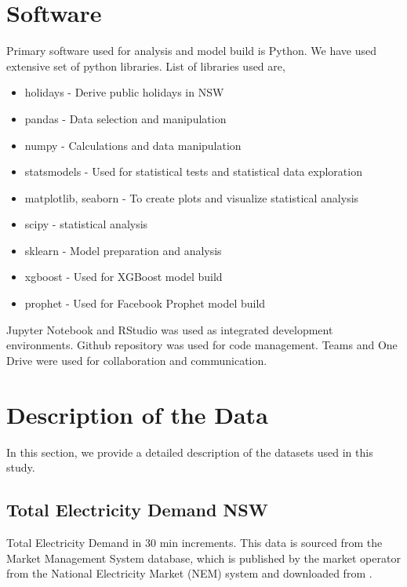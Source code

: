 \documentclass[mstat,12pt]{unswthesis}
\begin{document}
\section{Software}\label{software}

Primary software used for analysis and model build is Python. We have
used extensive set of python libraries. List of libraries used are,

\begin{itemize}
  \item holidays - Derive public holidays in NSW 
  \item pandas - Data selection and manipulation
  \item numpy - Calculations and data manipulation
  \item statsmodels - Used for statistical tests and statistical data exploration
  \item matplotlib, seaborn - To create plots and visualize statistical analysis
  \item scipy - statistical analysis
  \item sklearn - Model preparation and analysis
  \item xgboost - Used for XGBoost model build
  \item prophet - Used for Facebook Prophet model build
\end{itemize}

Jupyter Notebook and RStudio was used as integrated development
environments. Github repository was used for code management. Teams and
One Drive were used for collaboration and communication.

\section{Description of the Data}\label{description-of-the-data}

In this section, we provide a detailed description of the datasets used
in this study.

\subsection{Total Electricity Demand
NSW}\label{total-electricity-demand-nsw}

Total Electricity Demand in 30 min increments. This data is sourced from
the Market Management System database, which is published by the market
operator from the National Electricity Market (NEM) system and
downloaded from \cite{UNSW_project}.
\end{document}
